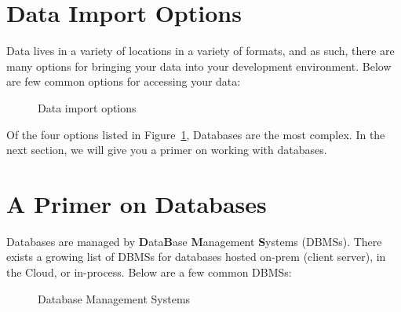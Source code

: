 \documentclass[
  letterpaper,
  DIV=11,
  numbers=noendperiod]{scrreprt}
\begin{document}
\section{Data Import Options}\label{data-import-options}

Data lives in a variety of locations in a variety of formats, and as
such, there are many options for bringing your data into your
development environment. Below are few common options for accessing your
data:

\begin{figure}


\caption{\label{fig-data-import-options}Data import options}

\end{figure}%

Of the four options listed in Figure~\ref{fig-data-import-options},
Databases are the most complex. In the next section, we will give you a
primer on working with databases.

\section{A Primer on Databases}\label{a-primer-on-databases}

Databases are managed by \textbf{D}ata\textbf{B}ase \textbf{M}anagement
\textbf{S}ystems (DBMSs). There exists a growing list of DBMSs for
databases hosted on-prem (client server), in the Cloud, or in-process.
Below are a few common DBMSs:

\begin{figure}


\caption{\label{fig-dbms}Database Management Systems}

\end{figure}%
\end{document}
